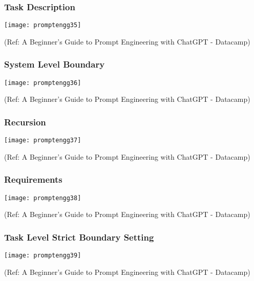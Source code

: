 \begin{frame}[fragile]\frametitle{Task Description}


\begin{center}
\texttt{[image: promptengg35]}

{\tiny (Ref: A Beginner's Guide to Prompt Engineering with ChatGPT - Datacamp)}
\end{center}		
		

\end{frame}

\begin{frame}[fragile]\frametitle{System Level Boundary}


\begin{center}
\texttt{[image: promptengg36]}

{\tiny (Ref: A Beginner's Guide to Prompt Engineering with ChatGPT - Datacamp)}
\end{center}		
		

\end{frame}

\begin{frame}[fragile]\frametitle{Recursion}


\begin{center}
\texttt{[image: promptengg37]}

{\tiny (Ref: A Beginner's Guide to Prompt Engineering with ChatGPT - Datacamp)}
\end{center}		
		

\end{frame}

\begin{frame}[fragile]\frametitle{Requirements}


\begin{center}
\texttt{[image: promptengg38]}

{\tiny (Ref: A Beginner's Guide to Prompt Engineering with ChatGPT - Datacamp)}
\end{center}		
		

\end{frame}

\begin{frame}[fragile]\frametitle{Task Level Strict Boundary Setting}


\begin{center}
\texttt{[image: promptengg39]}

{\tiny (Ref: A Beginner's Guide to Prompt Engineering with ChatGPT - Datacamp)}
\end{center}		
		

\end{frame}

